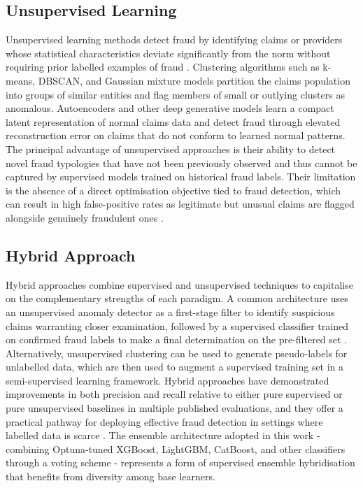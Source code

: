 \subsection{Unsupervised Learning}

Unsupervised learning methods detect fraud by identifying claims or providers whose statistical characteristics deviate significantly from the norm without requiring prior labelled examples of fraud \cite{zhou2020}. Clustering algorithms such as k-means, DBSCAN, and Gaussian mixture models partition the claims population into groups of similar entities and flag members of small or outlying clusters as anomalous. Autoencoders and other deep generative models learn a compact latent representation of normal claims data and detect fraud through elevated reconstruction error on claims that do not conform to learned normal patterns. The principal advantage of unsupervised approaches is their ability to detect novel fraud typologies that have not been previously observed and thus cannot be captured by supervised models trained on historical fraud labels. Their limitation is the absence of a direct optimisation objective tied to fraud detection, which can result in high false-positive rates as legitimate but unusual claims are flagged alongside genuinely fraudulent ones \cite{tsai2019}.

\subsection{Hybrid Approach}

Hybrid approaches combine supervised and unsupervised techniques to capitalise on the complementary strengths of each paradigm. A common architecture uses an unsupervised anomaly detector as a first-stage filter to identify suspicious claims warranting closer examination, followed by a supervised classifier trained on confirmed fraud labels to make a final determination on the pre-filtered set \cite{wang2021deep}. Alternatively, unsupervised clustering can be used to generate pseudo-labels for unlabelled data, which are then used to augment a supervised training set in a semi-supervised learning framework. Hybrid approaches have demonstrated improvements in both precision and recall relative to either pure supervised or pure unsupervised baselines in multiple published evaluations, and they offer a practical pathway for deploying effective fraud detection in settings where labelled data is scarce \cite{ahmadian2020}. The ensemble architecture adopted in this work - combining Optuna-tuned XGBoost, LightGBM, CatBoost, and other classifiers through a voting scheme - represents a form of supervised ensemble hybridisation that benefits from diversity among base learners.

